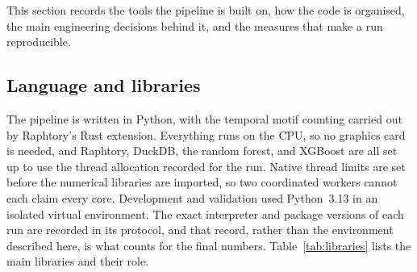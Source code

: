 \documentclass{thesisclass}
\begin{document}
This section records the tools the pipeline is built on, how the code is
organised, the main engineering decisions behind it, and the measures that make a
run reproducible.

\subsection{Language and libraries}

The pipeline is written in Python, with the temporal motif counting carried out by
Raphtory's Rust extension. Everything runs on the CPU, so no graphics card is
needed, and Raphtory, DuckDB, the random forest, and XGBoost are all set up to use
the thread allocation recorded for the run. Native thread limits are set before
the numerical libraries are imported, so two coordinated workers cannot each
claim every core. Development and validation used
Python~3.13 in an isolated virtual environment. The exact interpreter and package
versions of each run are recorded in its protocol, and that record, rather than the
environment described here, is what counts for the final numbers.
Table~\ref{tab:libraries} lists the main libraries and their role.
\end{document}
